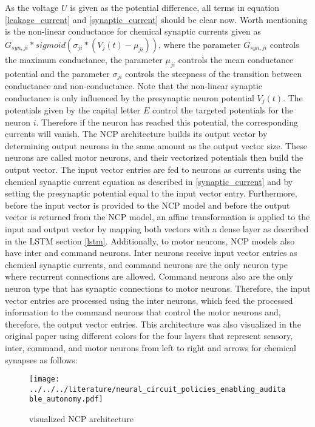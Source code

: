 \documentclass[draft,final]{vutinfth} %
\begin{document}
    As the voltage $U$ is given as the potential difference, all terms in equation \ref{leakage_current} and \ref{synaptic_current} should be clear now.
    Worth mentioning is the non-linear conductance for chemical synaptic currents given as $G_{syn,ji} * sigmoid(\sigma_{ji}*(V_j(t)-\mu_{ji}))$, where the parameter $G_{syn,ji}$ controls the maximum conductance, the parameter $\mu_{ji}$ controls the mean conductance potential and the parameter $\sigma_{ji}$ controls the steepness of the transition between conductance and non-conductance.
    Note that the non-linear synaptic conductance is only influenced by the presynaptic neuron potential $V_j(t)$.
    The potentials given by the capital letter $E$ control the targeted potentials for the neuron $i$. Therefore if the neuron has reached this potential, the corresponding currents will vanish.
    The NCP architecture builds its output vector by determining output neurons in the same amount as the output vector size.
    These neurons are called motor neurons, and their vectorized potentials then build the output vector.
    The input vector entries are fed to neurons as currents using the chemical synaptic current equation as described in \ref{synaptic_current} and by setting the presynaptic potential equal to the input vector entry.
    Furthermore, before the input vector is provided to the NCP model and before the output vector is returned from the NCP model, an affine transformation is applied to the input and output vector by mapping both vectors with a dense layer as described in the LSTM section \ref{lstm}.
    Additionally, to motor neurons, NCP models also have inter and command neurons.
    Inter neurons receive input vector entries as chemical synaptic currents, and command neurons are the only neuron type where recurrent connections are allowed.
    Command neurons also are the only neuron type that has synaptic connections to motor neurons.
    Therefore, the input vector entries are processed using the inter neurons, which feed the processed information to the command neurons that control the motor neurons and, therefore, the output vector entries.
    This architecture was also visualized in the original paper using different colors for the four layers that represent sensory, inter, command, and motor neurons from left to right and arrows for chemical synapses as follows:
    \begin{figure}[H]
        \centering{}
        \texttt{[image: ../../../literature/neural\_circuit\_policies\_enabling\_auditable\_autonomy.pdf]}
        \caption{visualized NCP architecture \cite[p. 3]{NCP}}
        \label{fig:ncp_vis}
    \end{figure}
\end{document}
